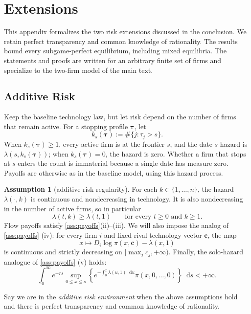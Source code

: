 \documentclass[12pt,reqno]{article}
\newcommand{\de}{\mathop{}\!\mathrm{d}}
\theoremstyle{definition} \newtheorem{example}{Example}
\theoremstyle{definition} \newtheorem{condition}{Condition}
\theoremstyle{definition} \newtheorem{corollary}{Corollary}
\theoremstyle{definition} \newtheorem{claim}{Claim}
\theoremstyle{definition} \newtheorem{definition}{Definition}
\theoremstyle{definition} \newtheorem{conjecture}{Conjecture}
\theoremstyle{definition} \newtheorem{Lemma}{Lemma}
\theoremstyle{definition} \newtheorem{lemma}{Lemma}
\theoremstyle{plain} \newtheorem{theorem}{Theorem}
\theoremstyle{definition} \newtheorem{assumption}{Assumption}
\theoremstyle{definition} \newtheorem*{assumptionnonumber}{Assumption}
\theoremstyle{definition} \newtheorem*{theoremNoNumber}{Proposition}
\theoremstyle{definition}
\theoremstyle{definition}\newtheorem{proposition}{Proposition}
\theoremstyle{definition} \newtheorem{result}{Result}
\theoremstyle{definition} \newtheorem*{definitionNoNumber}{Definition}
\theoremstyle{definition} \newtheorem{Definition}{Definition}
\theoremstyle{definition} \newtheorem*{DefinitionNoNumber}{Definition}
\theoremstyle{definition} \newtheorem*{fact}{Fact}
\theoremstyle{definition} \newtheorem*{property}{Property}
\theoremstyle{definition} \newtheorem{remark}{Remark}
\begin{document}
\section{Extensions}\label{app:extensions}

This appendix formalizes the two risk extensions discussed in the conclusion.
We retain perfect transparency and common knowledge of rationality. The results
bound every subgame-perfect equilibrium, including mixed equilibria. The statements and proofs are written for an arbitrary finite set of firms and specialize to the two-firm model of the main text.  

\subsection{Additive Risk }\label{app:additive risk}

Keep the baseline technology law, but let risk depend on the number of firms
that remain active. For a stopping profile $\bm\tau$, let
\[
k_s(\bm\tau):=\#\{j:\tau_j>s\}.
\]
When $k_s(\bm\tau)\geq1$, every active firm is at the frontier $s$, and the
date-$s$ hazard is $\lambda(s,k_s(\bm\tau))$; when $k_s(\bm\tau)=0$, the
hazard is zero. Whether a firm that stops at $s$ enters the count is
immaterial because a single date has measure zero. Payoffs are otherwise as in
the baseline model, using this hazard process.

\begin{assumption}[additive risk regularity]\label{ass:crowded-sc}
For each $k\in\{1,\ldots,n\}$, the hazard $\lambda(\cdot,k)$ is continuous
and nondecreasing in technology. It is also nondecreasing in the number of
active firms, so in particular
\[
\lambda(t,k)\geq\lambda(t,1)
\qquad\text{for every }t\geq0\text{ and }k\geq1.
\]
Flow payoffs satisfy \cref{ass:payoffs}(ii)--(iii). We will also impose the analog of \cref{ass:payoffs} (iv): for every firm $i$ and
fixed rival technology vector $\bm c$, the map
\[
x\longmapsto D_i\log\pi(x,\bm c)-\lambda(x,1)
\]
is continuous and strictly decreasing on
$[\max_j c_j,+\infty)$. Finally, the solo-hazard analogue of
\cref{ass:payoffs} (v) holds:
\[
\int_0^\infty e^{-rs}\sup_{0\leq x\leq s}
\left\{
e^{-\int_0^x\lambda(u,1)\de u}\pi(x,0,\ldots,0)
\right\}\de s<+\infty.
\]
\end{assumption}

Say we are in the \emph{additive risk environment} when the above assumptions hold and there is perfect transparency and common knowledge of rationality.
\end{document}
